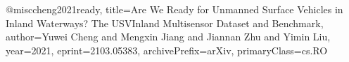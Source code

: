 
@misc{cheng2021ready,
      title={Are We Ready for Unmanned Surface Vehicles in Inland Waterways? The USVInland Multisensor Dataset and Benchmark}, 
      author={Yuwei Cheng and Mengxin Jiang and Jiannan Zhu and Yimin Liu},
      year={2021},
      eprint={2103.05383},
      archivePrefix={arXiv},
      primaryClass={cs.RO}
}